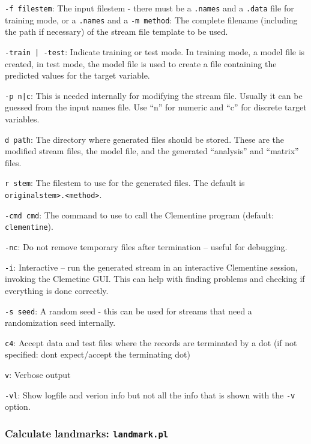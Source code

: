\documentclass[a4paper,10pt,twoside]{article}
\newenvironment{optionlist}
{\begin{list}{}
    {\setlength{\itemsep}{0em plus0em minus0ex}
      \setlength{\parsep}{0ex}
      \setlength{\topsep}{0em}
      \setlength{\leftmargin}{2em}
      \setlength{\listparindent}{0em}
      \setlength{\itemindent}{-2em}
      \setlength{\partopsep}{0ex}
    }}
  {\end{list}}
\begin{document}
\begin{optionlist}
\item \verb=-f filestem=: The input filestem - there must be a \texttt{.names}
and a \texttt{.data} file for training mode, or a \texttt{.names} and a
\verb=-m method=: The complete filename (including the path if necessary) of the stream file template to be used.
\item \verb=-train | -test=: Indicate training or test mode. In training mode,
a model file is created, in test mode, the model file is used to create
a file containing the predicted values for the target variable.
\item \verb=-p n|c=: This is needed internally for modifying the 
stream file. Usually it can be guessed from the input names file.
Use ``n'' for numeric and ``c'' for discrete target variables.
\item \verb=d path=: The directory where generated files should be stored.
These are the modified stream files, the model file, and the generated
``analysis'' and ``matrix'' files.
\item \verb=r stem=: The filestem to use for the generated files. The default 
is \verb=originalstem>.<method>=.
\item \verb=-cmd cmd=: The command to use to call the Clementine program
(default: \texttt{clementine}).
\item \verb=-nc=: Do not remove temporary files after termination -- useful for debugging.
\item \verb=-i=: Interactive -- run the generated stream in an interactive
Clementine session, invoking the Clemetine GUI. This can help with 
finding problems and checking if everything is done correctly.
\item \verb=-s seed=: A random seed - this can be used for streams that
need a randomization seed internally.
\item \verb=c4=: Accept data and test files where the records are
terminated by a dot (if not specified: dont expect/accept the terminating dot)
\item \verb=v=: Verbose output
\item \verb=-vl=: Show logfile and verion info but not all the info 
that is shown with the \texttt{-v} option.
\end{optionlist}

\subsubsection{Calculate landmarks: \texttt{landmark.pl} }
\end{document}
